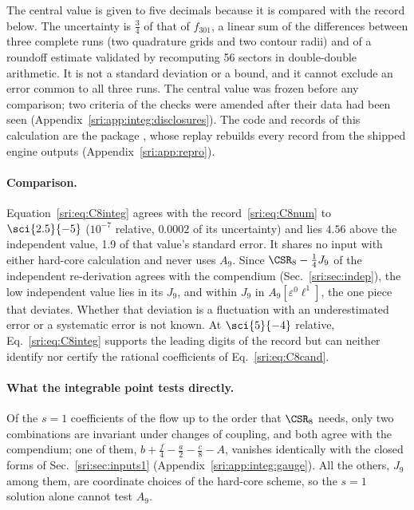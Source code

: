 The central value is given to five decimals because it is compared with the record below. The uncertainty is $\frac34$
of that of $f_{301}$, a linear sum of the differences between three complete runs (two
quadrature grids and two contour radii) and of a roundoff estimate validated by recomputing 56 sectors in double-double
arithmetic. It is not a standard deviation or a bound, and it cannot exclude an error common to all three runs. The
central value was frozen before any comparison; two criteria of the checks were amended after their data had been seen
(Appendix~\ref{sri:app:integ:disclosures}). The code and records of this calculation are the package
, whose replay rebuilds every record from the shipped engine outputs (Appendix~\ref{sri:app:repro}).

\paragraph{Comparison.} Equation~\eqref{sri:eq:C8integ} agrees with the record~\eqref{sri:eq:C8num} to $\sci{2.5}{-5}$
($10^{-7}$ relative, $0.0002$ of its uncertainty) and lies $4.56$ above the independent value, 1.9 of that value's
standard error. It shares no input with either hard-core calculation and never uses $A_9$. Since $\CSR_8-\frac14J_9$ of
the independent re-derivation agrees with the compendium (Sec.~\ref{sri:sec:indep}), the low independent value lies in its
$J_9$, and within $J_9$ in $A_9[\varepsilon^0\ell^1]$, the one piece that deviates. Whether that deviation is a
fluctuation with an underestimated error or a systematic error is not known. At $\sci{5}{-4}$ relative,
Eq.~\eqref{sri:eq:C8integ} supports the leading digits of the record but can neither identify nor certify the rational
coefficients of Eq.~\eqref{sri:eq:C8cand}.

\paragraph{What the integrable point tests directly.} Of the $s=1$ coefficients of the flow up to the order that
$\CSR_8$ needs, only two combinations are invariant under changes of coupling, and both agree with the compendium; one
of them, $b+\frac f4-\frac a2-\frac c8-A$, vanishes identically with the closed forms of Sec.~\ref{sri:sec:inputs1}
(Appendix~\ref{sri:app:integ:gauge}). All the others, $J_9$ among them, are coordinate choices of the hard-core scheme, so
the $s=1$ solution alone cannot test $A_9$.

